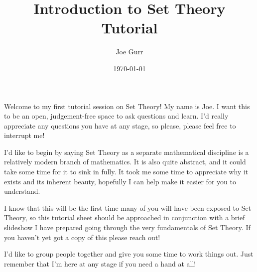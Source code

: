 \documentclass{article}
\title{Introduction to Set Theory Tutorial}
\author{Joe Gurr}
\date{\today}
\begin{document}
\maketitle

Welcome to my first tutorial session on Set Theory! My name is Joe.
I want this to be an open, judgement-free space to ask questions and learn.
I'd really appreciate any questions you have at any stage, so  please, please feel free to interrupt me!

I'd like to begin by saying Set Theory as a separate mathematical discipline is a relatively
modern branch of mathematics.
It is also quite abstract, and it could take some time for it to sink in fully.
It took me some time to appreciate why it exists and its inherent beauty,
hopefully I can help make it easier for you to understand.

I know that this will be the first time many of you will have been exposed
to Set Theory, so this tutorial sheet should be approached in conjunction with a brief slideshow
I have prepared going through the very fundamentals of Set Theory.
If you haven't yet got a copy of this please reach out!

I'd like to group people together and give you some time to work things out.
Just remember that I'm here at any stage if you need a hand at all!

\newpage
\end{document}
